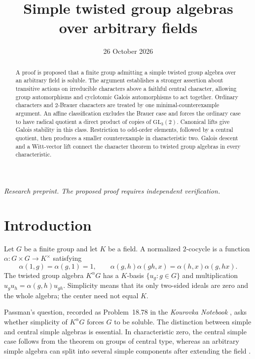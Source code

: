 \documentclass[11pt,a4paper]{amsart}
\title[Simple twisted group algebras]{Simple twisted group algebras\\over arbitrary fields}
\date{26 October 2026}
\theoremstyle{remark}
\numberwithin{equation}{section}
\begin{document}
\begin{abstract}
A proof is proposed that a finite group admitting a simple twisted group
algebra over an arbitrary field is soluble. The argument establishes a
stronger assertion about transitive actions on irreducible characters
above a faithful central character, allowing group automorphisms and
cyclotomic Galois automorphisms to act together. Ordinary characters
and $2$-Brauer characters are treated by one minimal-counterexample
argument. An affine classification excludes the Brauer case and forces
the ordinary case to have radical quotient a direct product of copies
of $\mathrm{GL}_3(2)$. Canonical lifts give Galois stability in this
class. Restriction to odd-order elements, followed by a central
quotient, then produces a smaller counterexample in characteristic two.
Galois descent and a Witt-vector lift connect the character theorem
to twisted group algebras in every characteristic.
\end{abstract}
\maketitle
\begin{center}
\small\itshape Research preprint. The proposed proof requires independent verification.
\end{center}
\medskip


\section{Introduction}

Let $G$ be a finite group and let $K$ be a field. A normalized
$2$-cocycle is a function $\alpha:G\times G\longrightarrow K^\times$
satisfying
\[
 \alpha(1,g)=\alpha(g,1)=1,\qquad
 \alpha(g,h)\alpha(gh,x)=\alpha(h,x)\alpha(g,hx).
\]
The twisted group algebra $K^\alpha G$ has a $K$-basis
$\{u_g:g\in G\}$ and multiplication
$u_gu_h=\alpha(g,h)u_{gh}$. Simplicity means that its only two-sided
ideals are zero and the whole algebra; the center need not equal $K$.

Passman's question, recorded as Problem~18.78 in the
\emph{Kourovka Notebook} \cite{Kourovka}, asks whether simplicity of
$K^\alpha G$ forces $G$ to be soluble. The distinction between simple
and central simple algebras is essential. In characteristic zero, the
central simple case follows from the theorem on groups of central
type, whereas an arbitrary simple algebra can split into several
simple components after extending the field \cite{Passman}.
\end{document}
